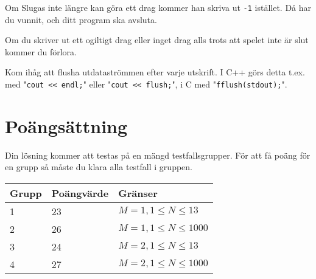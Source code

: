 Om Slugas inte längre kan göra ett drag kommer han skriva ut \texttt{-1} istället. Då har du vunnit, och ditt program ska avsluta.

Om du skriver ut ett ogiltigt drag eller inget drag alls trots att spelet inte är slut kommer du förlora.

Kom ihåg att flusha utdataströmmen efter varje utskrift. I C++ görs detta t.ex. med "\texttt{cout << endl;}" eller "\texttt{cout << flush;}", i C med "\texttt{fflush(stdout);}".

\section*{Poängsättning}
Din lösning kommer att testas på en mängd testfallsgrupper. För att få poäng för en grupp så måste du klara alla testfall i gruppen.

\begin{tabular}{| l | l | l |}
\hline
Grupp & Poängvärde & Gränser\\ \hline
1     & 23         & $ M=1, 1 \le N \le 13 $ \\ \hline
2     & 26         & $ M=1, 1 \le N \le 1000 $ \\ \hline
3     & 24         & $ M=2, 1 \le N \le 13 $ \\ \hline
4     & 27         & $ M=2, 1 \le N \le 1000 $ \\ \hline
\end{tabular}
